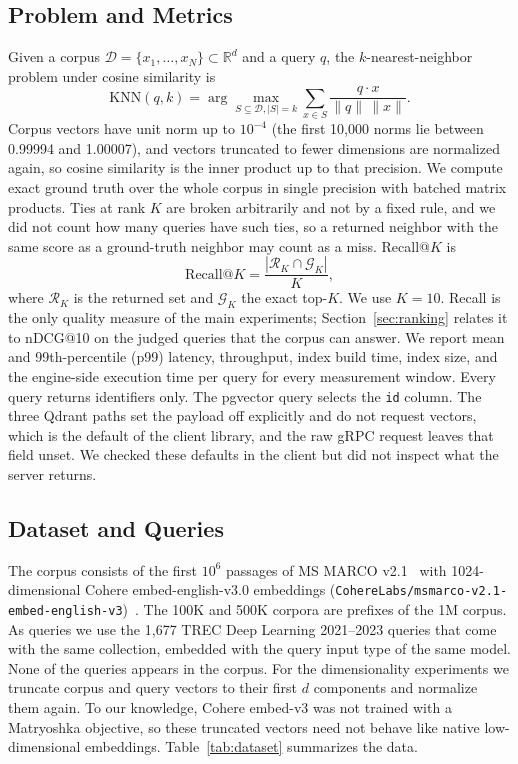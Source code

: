 \documentclass[preprint,12pt]{elsarticle}
\begin{document}
\subsection{Problem and Metrics}

Given a corpus $\mathcal{D}=\{x_1,\dots,x_N\}\subset\mathbb{R}^d$ and a query $q$, the
$k$-nearest-neighbor problem under cosine similarity is
\begin{equation}
\text{KNN}(q,k)=\arg\max_{S\subseteq\mathcal{D},|S|=k}\sum_{x\in S}
\frac{q\cdot x}{\|q\|\,\|x\|}.
\end{equation}
Corpus vectors have unit norm up to $10^{-4}$ (the first 10{,}000 norms lie between 0.99994
and 1.00007), and vectors truncated to fewer dimensions are normalized again, so cosine
similarity is the inner product up to that precision. We compute exact ground truth over the
whole corpus in single precision with batched matrix products. Ties at rank $K$ are broken
arbitrarily and not by a fixed rule, and we did not count how many queries have such ties,
so a returned neighbor with the same score as a ground-truth neighbor may count as a miss.
Recall@$K$ is
\begin{equation}
\text{Recall@}K=\frac{|\mathcal{R}_K\cap\mathcal{G}_K|}{K},
\end{equation}
where $\mathcal{R}_K$ is the returned set and $\mathcal{G}_K$ the exact top-$K$. We use
$K=10$. Recall is the only quality measure of the main experiments; Section~\ref{sec:ranking} relates it to
nDCG@10 on the judged queries that the corpus can answer. We report mean and 99th-percentile (p99) latency, throughput, index build time,
index size, and the engine-side execution time per query for every measurement window.
Every query returns identifiers only. The pgvector query selects the \texttt{id} column. The
three Qdrant paths set the payload off explicitly and do not request vectors, which is the
default of the client library, and the raw gRPC request leaves that field unset. We checked
these defaults in the client but did not inspect what the server returns.

\subsection{Dataset and Queries}

The corpus consists of the first $10^6$ passages of MS MARCO v2.1~\cite{msmarco} with
1024-dimensional Cohere embed-english-v3.0 embeddings
(\texttt{CohereLabs/msmarco-v2.1-embed-english-v3})~\cite{cohere2024}. The 100K and 500K
corpora are prefixes of the 1M corpus. As queries we use the 1{,}677 TREC Deep Learning
2021--2023 queries that come with the same collection, embedded with the query input
type of the same model. None of the queries appears in the corpus. For the
dimensionality experiments we truncate corpus and query vectors to their first $d$
components and normalize them again. To our knowledge, Cohere embed-v3 was not trained with a
Matryoshka objective, so these truncated vectors need not behave like native low-dimensional
embeddings. Table~\ref{tab:dataset} summarizes the data.
\end{document}
